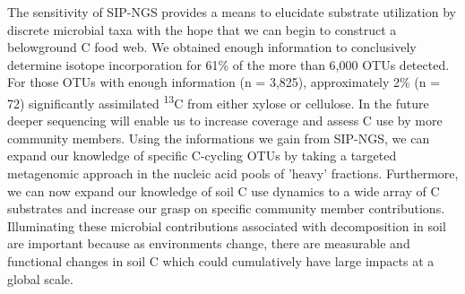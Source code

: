 The sensitivity of SIP-NGS provides a means to elucidate substrate utilization by discrete microbial taxa with the hope that we can begin to construct a belowground C food web. We obtained enough information to conclusively determine isotope incorporation for 61\% of the more than 6,000 OTUs detected. For those OTUs with enough information (n = 3,825), approximately 2\% (n = 72) significantly assimilated \textsuperscript{13}C from either xylose or cellulose. In the future deeper sequencing will enable us to increase coverage and assess C use by more community members. Using the informations we gain from SIP-NGS, we can expand our knowledge of specific C-cycling OTUs by taking a targeted metagenomic approach in the nucleic acid pools of 'heavy' fractions. Furthermore, we can now expand our knowledge of soil C use dynamics to a wide array of C substrates and increase our grasp on specific community member contributions. Illuminating these microbial contributions associated with decomposition in soil are important because as environments change, there are measurable and functional changes in soil C \cite{Grandy_2008} which could cumulatively have large impacts at a global scale.